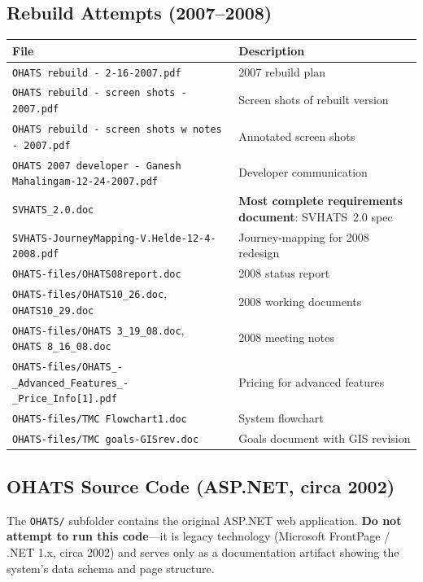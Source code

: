 \documentclass[12pt]{article}
\begin{document}
\subsection{Rebuild Attempts (2007--2008)}

\begin{center}
\begin{tabular}{lp{9cm}}
\toprule
File & Description \\
\midrule
\texttt{OHATS rebuild - 2-16-2007.pdf} & 2007 rebuild plan \\
\texttt{OHATS rebuild - screen shots - 2007.pdf} & Screen shots of rebuilt version \\
\texttt{OHATS rebuild - screen shots w notes - 2007.pdf} & Annotated screen shots \\
\texttt{OHATS 2007 developer - Ganesh Mahalingam-12-24-2007.pdf} & Developer communication \\
\texttt{SVHATS\_2.0.doc} & \textbf{Most complete requirements document}: SVHATS~2.0 spec \\
\texttt{SVHATS-JourneyMapping-V.Helde-12-4-2008.pdf} & Journey-mapping for 2008 redesign \\
\texttt{OHATS-files/OHATS08report.doc} & 2008 status report \\
\texttt{OHATS-files/OHATS10\_26.doc}, \texttt{OHATS10\_29.doc} & 2008 working documents \\
\texttt{OHATS-files/OHATS~3\_19\_08.doc}, \texttt{OHATS~8\_16\_08.doc} & 2008 meeting notes \\
\texttt{OHATS-files/OHATS\_-\_Advanced\_Features\_-\_Price\_Info[1].pdf} & Pricing for advanced features \\
\texttt{OHATS-files/TMC~Flowchart1.doc} & System flowchart \\
\texttt{OHATS-files/TMC~goals-GISrev.doc} & Goals document with GIS revision \\
\bottomrule
\end{tabular}
\end{center}

\subsection{OHATS Source Code (ASP.NET, circa 2002)}

The \texttt{OHATS/} subfolder contains the original ASP.NET web
application. \textbf{Do not attempt to run this code}---it is legacy
technology (Microsoft FrontPage / .NET 1.x, circa 2002) and serves
only as a documentation artifact showing the system's data schema and
page structure.
\end{document}
